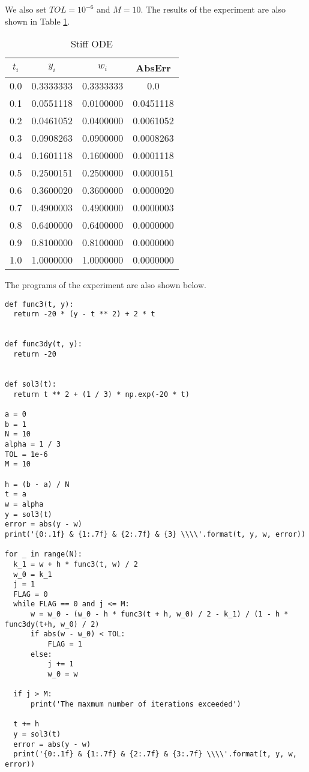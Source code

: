 \documentclass[preprint,12pt]{elsarticle}
\begin{document}
We also set $TOL=10^{-6}$ and $M=10$. The results of the experiment are also shown in Table \ref{tab:stiff}.

\begin{table}[h]
  \centering
  \begin{tabular}{cccc}
    \hline
    $t_i$ & $y_i$ & $w_i$ & AbsErr \\
    \hline
    0.0 & 0.3333333 & 0.3333333 & 0.0 \\
    0.1 & 0.0551118 & 0.0100000 & 0.0451118 \\
    0.2 & 0.0461052 & 0.0400000 & 0.0061052 \\
    0.3 & 0.0908263 & 0.0900000 & 0.0008263 \\
    0.4 & 0.1601118 & 0.1600000 & 0.0001118 \\
    0.5 & 0.2500151 & 0.2500000 & 0.0000151 \\
    0.6 & 0.3600020 & 0.3600000 & 0.0000020 \\
    0.7 & 0.4900003 & 0.4900000 & 0.0000003 \\
    0.8 & 0.6400000 & 0.6400000 & 0.0000000 \\
    0.9 & 0.8100000 & 0.8100000 & 0.0000000 \\
    1.0 & 1.0000000 & 1.0000000 & 0.0000000
  \end{tabular}
  \caption{Stiff ODE}
  \label{tab:stiff}
\end{table}

The programs of the experiment are also shown below.

\begin{lstlisting}
def func3(t, y):
  return -20 * (y - t ** 2) + 2 * t


def func3dy(t, y):
  return -20


def sol3(t):
  return t ** 2 + (1 / 3) * np.exp(-20 * t)

a = 0
b = 1
N = 10
alpha = 1 / 3
TOL = 1e-6
M = 10

h = (b - a) / N
t = a
w = alpha
y = sol3(t)
error = abs(y - w)
print('{0:.1f} & {1:.7f} & {2:.7f} & {3} \\\\'.format(t, y, w, error))

for _ in range(N):
  k_1 = w + h * func3(t, w) / 2
  w_0 = k_1
  j = 1
  FLAG = 0
  while FLAG == 0 and j <= M:
      w = w_0 - (w_0 - h * func3(t + h, w_0) / 2 - k_1) / (1 - h * func3dy(t+h, w_0) / 2)
      if abs(w - w_0) < TOL:
          FLAG = 1
      else:
          j += 1
          w_0 = w
  
  if j > M:
      print('The maxmum number of iterations exceeded')
  
  t += h
  y = sol3(t)
  error = abs(y - w)
  print('{0:.1f} & {1:.7f} & {2:.7f} & {3:.7f} \\\\'.format(t, y, w, error))
\end{lstlisting}
\end{document}
